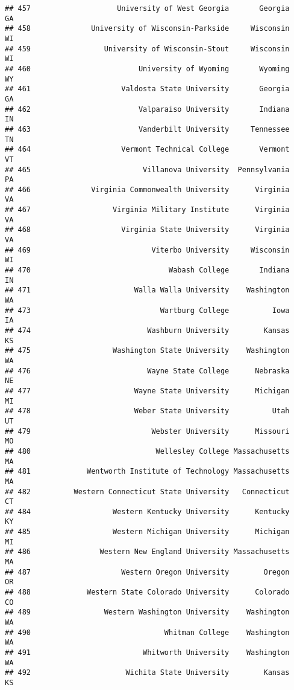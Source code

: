 \documentclass[
]{article}
\begin{document}
\begin{verbatim}
## 457                    University of West Georgia       Georgia         GA
## 458              University of Wisconsin-Parkside     Wisconsin         WI
## 459                 University of Wisconsin-Stout     Wisconsin         WI
## 460                         University of Wyoming       Wyoming         WY
## 461                     Valdosta State University       Georgia         GA
## 462                         Valparaiso University       Indiana         IN
## 463                         Vanderbilt University     Tennessee         TN
## 464                     Vermont Technical College       Vermont         VT
## 465                          Villanova University  Pennsylvania         PA
## 466              Virginia Commonwealth University      Virginia         VA
## 467                   Virginia Military Institute      Virginia         VA
## 468                     Virginia State University      Virginia         VA
## 469                            Viterbo University     Wisconsin         WI
## 470                                Wabash College       Indiana         IN
## 471                        Walla Walla University    Washington         WA
## 473                              Wartburg College          Iowa         IA
## 474                           Washburn University        Kansas         KS
## 475                   Washington State University    Washington         WA
## 476                           Wayne State College      Nebraska         NE
## 477                        Wayne State University      Michigan         MI
## 478                        Weber State University          Utah         UT
## 479                            Webster University      Missouri         MO
## 480                             Wellesley College Massachusetts         MA
## 481             Wentworth Institute of Technology Massachusetts         MA
## 482          Western Connecticut State University   Connecticut         CT
## 484                   Western Kentucky University      Kentucky         KY
## 485                   Western Michigan University      Michigan         MI
## 486                Western New England University Massachusetts         MA
## 487                     Western Oregon University        Oregon         OR
## 488             Western State Colorado University      Colorado         CO
## 489                 Western Washington University    Washington         WA
## 490                               Whitman College    Washington         WA
## 491                          Whitworth University    Washington         WA
## 492                      Wichita State University        Kansas         KS

\end{verbatim}
\end{document}
